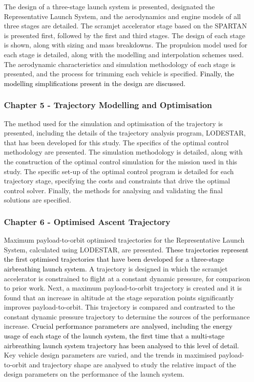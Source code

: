       The design of a three-stage launch system is presented, designated the Representative Launch System, and the aerodynamics and engine models of all three stages are detailed. The scramjet accelerator stage based on the SPARTAN is presented first, followed by the first and third stages. The design of each stage is shown, along with sizing and mass breakdowns. The propulsion model used for each stage is detailed, along with the modelling and interpolation schemes used. The aerodynamic characteristics and simulation methodology of each stage is presented, and the process for trimming each vehicle is specified. \textcolor{black}{Finally, the modelling simplifications present in the design are discussed.}
      
      
      \subsubsection*{Chapter 5 - Trajectory Modelling and Optimisation}
      
      The method used for the simulation and optimisation of the trajectory is presented, including the details of the trajectory analysis program, LODESTAR, that has been developed for this study. The specifics of the optimal control methodology are presented. The simulation methodology is detailed, along with the construction of the optimal control simulation for the mission used in this study. The specific set-up of the optimal control program is detailed for each trajectory stage, specifying the costs and constraints that drive the optimal control solver. Finally, the methods for analysing and validating the final solutions are specified.
      
      \subsubsection*{Chapter 6 - Optimised Ascent Trajectory}
      
Maximum payload-to-orbit optimised trajectories for the Representative Launch System, calculated using LODESTAR, are presented. \textcolor{black}{These trajectories represent the first optimised trajectories that have been developed for a three-stage airbreathing launch system.} A trajectory is designed in which the scramjet accelerator is constrained to flight at a constant dynamic pressure, for comparison to prior work. Next, a maximum payload-to-orbit trajectory is created and it is found that an increase in altitude at the stage separation points significantly improves payload-to-orbit.
 This trajectory is compared and contrasted to the constant dynamic pressure trajectory to determine the sources of the performance increase. \textcolor{black}{Crucial performance parameters are analysed, including the energy usage of each stage of the launch system, the first time that a multi-stage airbreathing launch system trajectory has been analysed to this level of detail.} 
 Key vehicle design parameters are varied, and the trends in maximised payload-to-orbit and trajectory shape are analysed to study the relative impact of the design parameters on the performance of the launch system. 
 
